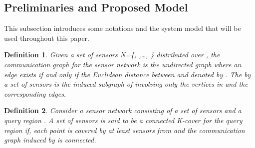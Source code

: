 \documentclass{acm_proc_article-sp}
\newtheorem{definition}{Definition}
\begin{document}
 \subsection{Preliminaries and Proposed Model}
 This subsection introduces some notations and the system model that will be used throughout this paper.
 \vspace{-0.5cm}
 
        \begin{definition} 
     Given a set of sensors {\cal N}={\{, ,\ldots, \}} distributed over , the {\it communication graph}  for the sensor network is the undirected graph where an edge  exists if and only if the Euclidean distance between  and  denoted by . The    by a set of sensors  is the induced subgraph of  involving only the vertices in  and the corresponding edges.
    \end{definition}
    \vspace{-0.7cm}
        \begin{definition}
     Consider a sensor network consisting of a set  of  sensors and a query region . A set of sensors  is said to be a {\it connected K-cover} for the query region if, each point  is covered by at least  sensors from  and the communication graph induced by  is connected.
    \end{definition}
    \vspace{-0.5cm}
    
\end{document}
